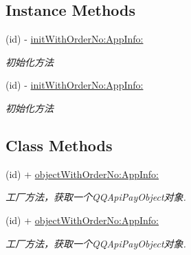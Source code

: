 \subsection*{Instance Methods}
\begin{DoxyCompactItemize}
\item 
\mbox{\label{interface_q_q_api_pay_object_afe6e6046ebf848355704b034d864970d}} 
(id) -\/ \mbox{\hyperlink{interface_q_q_api_pay_object_afe6e6046ebf848355704b034d864970d}{init\+With\+Order\+No\+:\+App\+Info\+:}}
\begin{DoxyCompactList}\small\item\em 初始化方法 \end{DoxyCompactList}\item 
\mbox{\label{interface_q_q_api_pay_object_afe6e6046ebf848355704b034d864970d}} 
(id) -\/ \mbox{\hyperlink{interface_q_q_api_pay_object_afe6e6046ebf848355704b034d864970d}{init\+With\+Order\+No\+:\+App\+Info\+:}}
\begin{DoxyCompactList}\small\item\em 初始化方法 \end{DoxyCompactList}\end{DoxyCompactItemize}
\subsection*{Class Methods}
\begin{DoxyCompactItemize}
\item 
\mbox{\label{interface_q_q_api_pay_object_a6cefbe1734b9eeb59c2cacec31fe8849}} 
(id) + \mbox{\hyperlink{interface_q_q_api_pay_object_a6cefbe1734b9eeb59c2cacec31fe8849}{object\+With\+Order\+No\+:\+App\+Info\+:}}
\begin{DoxyCompactList}\small\item\em 工厂方法，获取一个\+Q\+Q\+Api\+Pay\+Object对象. \end{DoxyCompactList}\item 
\mbox{\label{interface_q_q_api_pay_object_a6cefbe1734b9eeb59c2cacec31fe8849}} 
(id) + \mbox{\hyperlink{interface_q_q_api_pay_object_a6cefbe1734b9eeb59c2cacec31fe8849}{object\+With\+Order\+No\+:\+App\+Info\+:}}
\begin{DoxyCompactList}\small\item\em 工厂方法，获取一个\+Q\+Q\+Api\+Pay\+Object对象. \end{DoxyCompactList}\end{DoxyCompactItemize}
